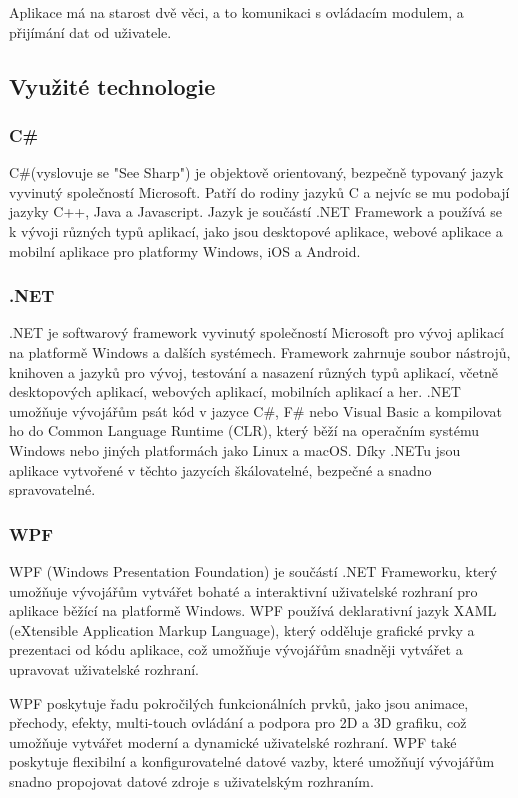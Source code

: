         Aplikace má na starost dvě věci, a to komunikaci s ovládacím modulem, a přijímání dat od uživatele.

        \subsection{Využité technologie}
            \subsubsection{C\#}
            C\#(vyslovuje se "See Sharp") je objektově orientovaný, bezpečně typovaný jazyk vyvinutý společností Microsoft. Patří do rodiny jazyků C a nejvíc se mu podobají jazyky C++, Java a Javascript. Jazyk je součástí .NET Framework a používá se k vývoji různých typů aplikací, jako jsou desktopové aplikace, webové aplikace a mobilní aplikace pro platformy Windows, iOS a Android\cite{CSharp}.
            \subsubsection{.NET}
            .NET je softwarový framework vyvinutý společností Microsoft pro vývoj aplikací na platformě Windows a dalších systémech. Framework zahrnuje soubor nástrojů, knihoven a jazyků pro vývoj, testování a nasazení různých typů aplikací, včetně desktopových aplikací, webových aplikací, mobilních aplikací a her. .NET umožňuje vývojářům psát kód v jazyce C\#, F\# nebo Visual Basic a kompilovat ho do Common Language Runtime (CLR), který běží na operačním systému Windows nebo jiných platformách jako Linux a macOS. Díky .NETu jsou aplikace vytvořené v těchto jazycích škálovatelné, bezpečné a snadno spravovatelné\cite{.NET}.
            \subsubsection{WPF}
            WPF (Windows Presentation Foundation) je součástí .NET Frameworku, který umožňuje vývojářům vytvářet bohaté a interaktivní uživatelské rozhraní pro aplikace běžící na platformě Windows. WPF používá deklarativní jazyk XAML (eXtensible Application Markup Language), který odděluje grafické prvky a prezentaci od kódu aplikace, což umožňuje vývojářům snadněji vytvářet a upravovat uživatelské rozhraní.

            WPF poskytuje řadu pokročilých funkcionálních prvků, jako jsou animace, přechody, efekty, multi-touch ovládání a podpora pro 2D a 3D grafiku, což umožňuje vytvářet moderní a dynamické uživatelské rozhraní. WPF také poskytuje flexibilní a konfigurovatelné datové vazby, které umožňují vývojářům snadno propojovat datové zdroje s uživatelským rozhraním\cite{WPF}.
            
